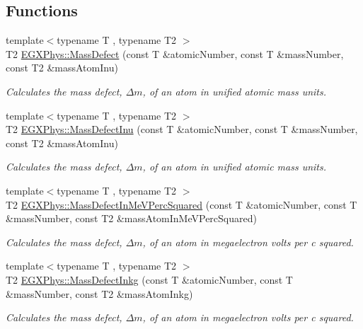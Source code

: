 \subsection*{Functions}
\begin{DoxyCompactItemize}
\item 
{\footnotesize template$<$typename T , typename T2 $>$ }\\T2 \mbox{\hyperlink{group___e_g_x_phys-_mass_defect_gae89f2dfa65992c0314adc2440b2f582a}{E\+G\+X\+Phys\+::\+Mass\+Defect}} (const T \&atomic\+Number, const T \&mass\+Number, const T2 \&mass\+Atom\+Inu)
\begin{DoxyCompactList}\small\item\em Calculates the mass defect, $\Delta m$, of an atom in unified atomic mass units. \end{DoxyCompactList}\item 
{\footnotesize template$<$typename T , typename T2 $>$ }\\T2 \mbox{\hyperlink{group___e_g_x_phys-_mass_defect_ga70400004a5cb622de372ab84670731ef}{E\+G\+X\+Phys\+::\+Mass\+Defect\+Inu}} (const T \&atomic\+Number, const T \&mass\+Number, const T2 \&mass\+Atom\+Inu)
\begin{DoxyCompactList}\small\item\em Calculates the mass defect, $\Delta m$, of an atom in unified atomic mass units. \end{DoxyCompactList}\item 
{\footnotesize template$<$typename T , typename T2 $>$ }\\T2 \mbox{\hyperlink{group___e_g_x_phys-_mass_defect_gab51169bf871d0ea0ee0642fa300228fe}{E\+G\+X\+Phys\+::\+Mass\+Defect\+In\+Me\+V\+Perc\+Squared}} (const T \&atomic\+Number, const T \&mass\+Number, const T2 \&mass\+Atom\+In\+Me\+V\+Perc\+Squared)
\begin{DoxyCompactList}\small\item\em Calculates the mass defect, $\Delta m$, of an atom in megaelectron volts per c squared. \end{DoxyCompactList}\item 
{\footnotesize template$<$typename T , typename T2 $>$ }\\T2 \mbox{\hyperlink{group___e_g_x_phys-_mass_defect_gad5378933021e13598a76bd8581b1e887}{E\+G\+X\+Phys\+::\+Mass\+Defect\+Inkg}} (const T \&atomic\+Number, const T \&mass\+Number, const T2 \&mass\+Atom\+Inkg)
\begin{DoxyCompactList}\small\item\em Calculates the mass defect, $\Delta m$, of an atom in megaelectron volts per c squared. \end{DoxyCompactList}\item 

\end{DoxyCompactItemize}
